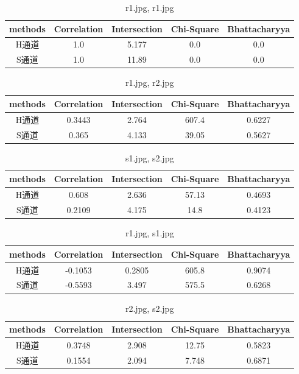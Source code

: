 \documentclass[a4paper, 12pt, UTF8]{article}
\begin{document}
\begin{enumerate}
\begin{table}[h!]
    \centering
    \caption{r1.jpg, r1.jpg}
    \begin{tabular}{ccccc}
        methods & Correlation & Intersection & Chi-Square & Bhattacharyya \\ \hline
        H通道 & 1.0 & 5.177 & 0.0 & 0.0 \\
        S通道 & 1.0 & 11.89 & 0.0 & 0.0 \\
    \end{tabular}
\end{table}
\begin{table}[h!]
    \centering
    \caption{r1.jpg, r2.jpg}
    \begin{tabular}{ccccc}
        methods & Correlation & Intersection & Chi-Square & Bhattacharyya \\ \hline
        H通道 & 0.3443 & 2.764 & 607.4 & 0.6227 \\
        S通道 & 0.365 & 4.133 & 39.05 & 0.5627 \\
    \end{tabular}
\end{table}
\begin{table}[h!]
    \centering
    \caption{s1.jpg, s2.jpg}
    \begin{tabular}{ccccc}
        methods & Correlation & Intersection & Chi-Square & Bhattacharyya \\ \hline
        H通道 & 0.608 & 2.636 & 57.13 & 0.4693 \\
        S通道 & 0.2109 & 4.175 & 14.8 & 0.4123 \\
    \end{tabular}
\end{table}
\begin{table}[h!]
    \centering
    \caption{r1.jpg, s1.jpg}
    \begin{tabular}{ccccc}
        methods & Correlation & Intersection & Chi-Square & Bhattacharyya \\ \hline
        H通道 & -0.1053 & 0.2805 & 605.8 & 0.9074 \\
        S通道 & -0.5593 & 3.497 & 575.5 & 0.6268 \\
    \end{tabular}
\end{table}
\begin{table}[h!]
    \centering
    \caption{r2.jpg, s2.jpg}
    \begin{tabular}{ccccc}
        methods & Correlation & Intersection & Chi-Square & Bhattacharyya \\ \hline
        H通道 & 0.3748 & 2.908 & 12.75 & 0.5823 \\
        S通道 & 0.1554 & 2.094 & 7.748 & 0.6871 \\
    \end{tabular}
\end{table}


\end{enumerate}
\end{document}
